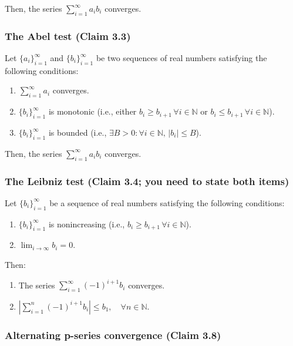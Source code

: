 Then, the series $\sum_{i=1}^\infty a_i b_i$ converges.

\subsubsection{The Abel test (Claim 3.3)}


Let $\{a_i\}_{i=1}^\infty$ and $\{b_i\}_{i=1}^\infty$ be two sequences of real numbers satisfying the following conditions:
\begin{enumerate}[label=(\alph*)]
    \item $\sum_{i=1}^\infty a_i$ converges.
    \item $\{b_i\}_{i=1}^\infty$ is monotonic
    (i.e., either $b_i \geq b_{i+1} \, \forall i \in \mathbb{N}$ or $b_i \leq b_{i+1} \, \forall i \in \mathbb{N}$).
    \item $\{b_i\}_{i=1}^\infty$ is bounded
    (i.e., $\exists B > 0 : \forall i \in \mathbb{N}, \, |b_i| \leq B$).
\end{enumerate}

Then, the series $\sum_{i=1}^\infty a_i b_i$ converges.

\subsubsection{The Leibniz test (Claim 3.4; you need to state both items)}


Let $\{b_i\}_{i=1}^\infty$ be a sequence of real numbers satisfying the following conditions:
\begin{enumerate}[label=(\alph*)]
    \item $\{b_i\}_{i=1}^\infty$ is nonincreasing
    (i.e., $b_i \geq b_{i+1} \, \forall i \in \mathbb{N}$).
    \item $\lim_{i \to \infty} b_i = 0$.
\end{enumerate}

Then:
\begin{enumerate}[label=(\arabic*)]
    \item The series $\sum_{i=1}^\infty (-1)^{i+1} b_i$ converges.
    \item $\left| \sum_{i=1}^n (-1)^{i+1} b_i \right| \leq b_1, \quad \forall n \in \mathbb{N}$.
\end{enumerate}

\subsubsection{Alternating p-series convergence (Claim 3.8)}


